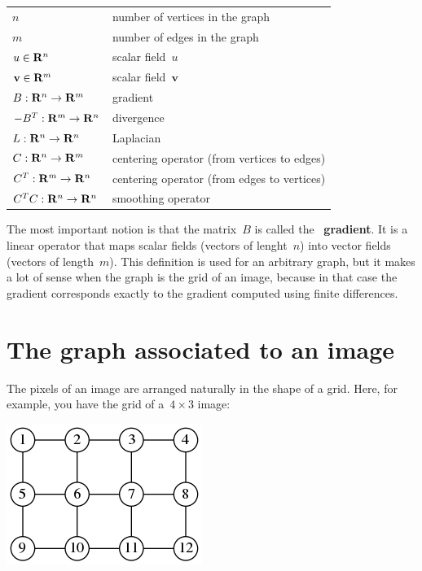 \begin{tabular}{l|l}
	$n$ & number of vertices in the graph \\
	$m$ & number of edges in the graph \\
	$u\in\mathbf{R}^n$ & scalar field~$u$ \\
	$\mathbf{v}\in\mathbf{R}^m$ & scalar field~$\mathbf{v}$ \\
	$B:\mathbf{R}^n\to\mathbf{R}^m$ & gradient \\
	$-B^T:\mathbf{R}^m\to\mathbf{R}^n$ & divergence \\
	$L:\mathbf{R}^n\to\mathbf{R}^n$ & Laplacian \\
	$C:\mathbf{R}^n\to\mathbf{R}^m$ & centering operator (from vertices to edges) \\
	$C^T:\mathbf{R}^m\to\mathbf{R}^n$ & centering operator (from edges to vertices) \\
	$C^TC:\mathbf{R}^n\to\mathbf{R}^n$ & smoothing operator
\end{tabular}

The most important notion is that the matrix~$B$ is called the~{\bf
gradient}.  It is a linear operator that maps scalar fields (vectors of
lenght~$n$) into vector fields (vectors of length~$m$).
This definition is used for an arbitrary graph, but it makes a lot of sense
when the graph is the grid of an image, because in that case the gradient
corresponds exactly to the gradient computed using finite differences.


\section{The graph associated to an image}

The pixels of an image are arranged naturally in the shape of a grid.
Here, for example, you have the grid of a~$4\times 3$ image:

\includegraphics{gridgraph.png}

